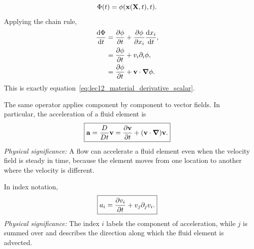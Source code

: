 \documentclass[../main.tex]{subfiles}
\begin{document}
\begin{center}
\end{center}

\begin{equation}
  \Phi(t)=\phi(\mathbf{x}(\mathbf{X},t),t).
  \label{eq:lec12_scalar_along_particle}
\end{equation}
Applying the chain rule,
\begin{align}
  \dv{\Phi}{t}
  &=
  \pdv{\phi}{t}
  +
  \pdv{\phi}{x_i}\dv{x_i}{t},
  \label{eq:lec12_chain_rule_1}\\
  &=
  \pdv{\phi}{t}
  +
  v_i\partial_i\phi,
  \label{eq:lec12_chain_rule_2}\\
  &=
  \pdv{\phi}{t}
  +
  \mathbf{v}\cdot\grad\phi.
  \label{eq:lec12_chain_rule_3}
\end{align}
This is exactly equation~\eqref{eq:lec12_material_derivative_scalar}.

The same operator applies component by component to vector fields. In particular, the acceleration of a fluid element is
\begin{equation}
  \boxed{
  \mathbf{a}
  =
  \frac{D}{Dt}\mathbf{v}
  =
  \pdv{\mathbf{v}}{t}
  +
  (\mathbf{v}\cdot\grad)\mathbf{v}.}
  \label{eq:lec12_acceleration_vector}
\end{equation}
\textit{Physical significance:} A flow can accelerate a fluid element even when the velocity field is steady in time, because the element moves from one location to another where the velocity is different.

In index notation,
\begin{equation}
  \boxed{
  a_i
  =
  \pdv{v_i}{t}
  +
  v_j\partial_j v_i.}
  \label{eq:lec12_acceleration_index}
\end{equation}
\textit{Physical significance:} The index $i$ labels the component of acceleration, while $j$ is summed over and describes the direction along which the fluid element is advected.
\end{document}
